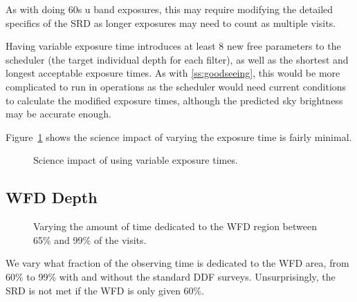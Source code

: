 As with doing 60s u band exposures, this may require modifying the detailed specifics of the SRD as longer exposures may need to count as multiple visits.

Having variable exposure time introduces at least 8 new free parameters to the scheduler (the target individual depth for each filter), as well as the shortest and longest acceptable exposure times.  As with \ref{ss:goodseeing}, this would be more complicated to run in operations as the scheduler would need current conditions to calculate the modified exposure times, although the predicted sky brightness may be accurate enough.

Figure~\ref{fig:var_radar} shows the science impact of varying the exposure time is fairly minimal. 

\begin{figure}
\caption{Science impact of using variable exposure times.}\label{fig:var_radar}
\end{figure}


\subsection{WFD Depth}

\begin{figure}
\caption{Varying the amount of time dedicated to the WFD region between 65\% and 99\% of the visits.}
\end{figure}


We vary what fraction of the observing time is dedicated to the WFD area, from 60\% to 99\% with and without the standard DDF surveys. Unsurprisingly, the SRD is not met if the WFD is only given 60\%.


